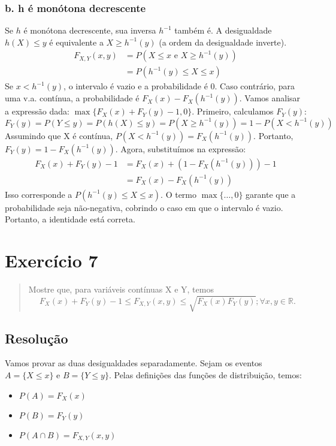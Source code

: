 \documentclass[12pt]{article}
\begin{document}
\subsubsection*{b. h é monótona decrescente}
Se $h$ é monótona decrescente, sua inversa $h^{-1}$ também é. A desigualdade $h(X) \le y$ é equivalente a $X \ge h^{-1}(y)$ (a ordem da desigualdade inverte).
\begin{align*}
    F_{X,Y}(x,y) &= P(X \le x \text{ e } X \ge h^{-1}(y)) \\
    &= P(h^{-1}(y) \le X \le x)
\end{align*}
Se $x < h^{-1}(y)$, o intervalo é vazio e a probabilidade é 0. Caso contrário, para uma v.a. contínua, a probabilidade é $F_X(x) - F_X(h^{-1}(y))$.
Vamos analisar a expressão dada: $\max\{F_X(x) + F_Y(y) - 1, 0\}$.
Primeiro, calculamos $F_Y(y)$:
\[ F_Y(y) = P(Y \le y) = P(h(X) \le y) = P(X \ge h^{-1}(y)) = 1 - P(X < h^{-1}(y)) \]
Assumindo que X é contínua, $P(X < h^{-1}(y)) = F_X(h^{-1}(y))$. Portanto, $F_Y(y) = 1 - F_X(h^{-1}(y))$.
Agora, substituímos na expressão:
\begin{align*}
    F_X(x) + F_Y(y) - 1 &= F_X(x) + (1 - F_X(h^{-1}(y))) - 1 \\
    &= F_X(x) - F_X(h^{-1}(y))
\end{align*}
Isso corresponde a $P(h^{-1}(y) \le X \le x)$. O termo $\max\{\dots, 0\}$ garante que a probabilidade seja não-negativa, cobrindo o caso em que o intervalo é vazio.
Portanto, a identidade está correta. \hfill \qedsymbol

\pagebreak

\section{Exercício 7}
\begin{quote}
Mostre que, para variáveis contínuas X e Y, temos
\[ F_X(x) + F_Y(y) - 1 \le F_{X,Y}(x,y) \le \sqrt{F_X(x)F_Y(y)}; \forall x,y \in \mathbb{R}. \]
\end{quote}

\subsection*{Resolução}
Vamos provar as duas desigualdades separadamente. Sejam os eventos $A = \{X \le x\}$ e $B = \{Y \le y\}$. Pelas definições das funções de distribuição, temos:
\begin{itemize}
    \item $P(A) = F_X(x)$
    \item $P(B) = F_Y(y)$
    \item $P(A \cap B) = F_{X,Y}(x,y)$
\end{itemize}
\end{document}
